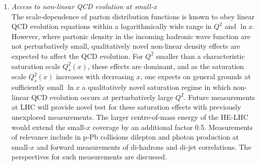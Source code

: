 \documentclass[../report.tex]{subfiles}
\begin{document}
\begin{enumerate}
\item {\it Access to non-linear QCD evolution at small-x}\\ The scale-dependence of parton distribution functions is known to obey linear QCD evolution equations within a logarithmically wide range in $Q^2$ and $\ln x$. However, where partonic density in the incoming hadronic wave function are not perturbatively small, qualitatively novel non-linear density effects are expected to affect the QCD evolution. For $Q^2$ smaller than a characteristic saturation scale $Q^2_s(x)$, these effects are dominant, and as the saturation scale $Q^2_s(x)$ increases with decreasing $x$, one expects on general grounds at sufficiently small $\ln x$ a qualitatively novel saturation regime in which non-linear QCD evolution occurs at perturbatively large $Q^2$. Future measurements at LHC will provide novel test for these saturation effects with previously unexplored measurements. The larger centre-of-mass energy of the HE-LHC would extend the small-$x$ coverage by an additional factor 0.5. Measurements of relevance include in p-Pb collisions dilepton and photon production at small-$x$ and forward measurements of di-hadrons and di-jet correlations. The perspectives for such measurements are discussed. 
\end{enumerate}
\end{document}
